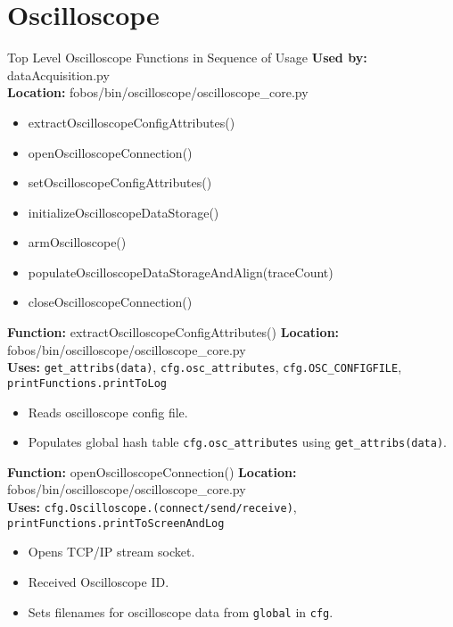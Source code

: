 \chapter{Oscilloscope}

\begin{cergbox}{Top Level Oscilloscope Functions in Sequence of Usage}
  \textbf{Used by:} dataAcquisition.py\\
  \textbf{Location:} fobos/bin/oscilloscope/oscilloscope\_core.py
  \tcblower
  \begin{itemize}
    \item extractOscilloscopeConfigAttributes() 
    \item openOscilloscopeConnection()
    \item setOscilloscopeConfigAttributes()
    \item initializeOscilloscopeDataStorage() 
    \item armOscilloscope() 
    \item populateOscilloscopeDataStorageAndAlign(traceCount)
    \item closeOscilloscopeConnection()
  \end{itemize}
\end{cergbox}

\begin{cergbox}{\textbf{Function:} extractOscilloscopeConfigAttributes()}
  \textbf{Location:} fobos/bin/oscilloscope/oscilloscope\_core.py\\
  \textbf{Uses:} \verb|get_attribs(data)|, \verb|cfg.osc_attributes|, \verb|cfg.OSC_CONFIGFILE|, \verb|printFunctions.printToLog| 
  \tcblower
  \begin{itemize}
    \item Reads oscilloscope config file.
    \item Populates global hash table \verb|cfg.osc_attributes| using \verb|get_attribs(data)|.
  \end{itemize}
\end{cergbox}

\begin{cergbox}{\textbf{Function:} openOscilloscopeConnection()}
  \textbf{Location:} fobos/bin/oscilloscope/oscilloscope\_core.py\\
  \textbf{Uses:} \verb|cfg.Oscilloscope.(connect/send/receive)|, \verb|printFunctions.printToScreenAndLog| 
  \tcblower
  \begin{itemize}
    \item Opens TCP/IP stream socket.
    \item Received Oscilloscope ID.
    \item Sets filenames for oscilloscope data from \texttt{global} in \texttt{cfg}.
  \end{itemize}
\end{cergbox}

